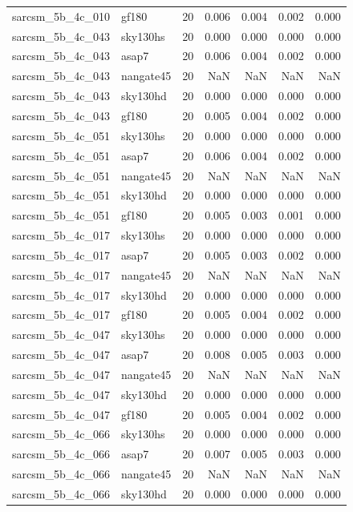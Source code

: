 \begin{tabular}{llrrrrr}
sarcsm\_5b\_4c\_010 & gf180 & 20 & 0.006 & 0.004 & 0.002 & 0.000 \\
sarcsm\_5b\_4c\_043 & sky130hs & 20 & 0.000 & 0.000 & 0.000 & 0.000 \\
sarcsm\_5b\_4c\_043 & asap7 & 20 & 0.006 & 0.004 & 0.002 & 0.000 \\
sarcsm\_5b\_4c\_043 & nangate45 & 20 & NaN & NaN & NaN & NaN \\
sarcsm\_5b\_4c\_043 & sky130hd & 20 & 0.000 & 0.000 & 0.000 & 0.000 \\
sarcsm\_5b\_4c\_043 & gf180 & 20 & 0.005 & 0.004 & 0.002 & 0.000 \\
sarcsm\_5b\_4c\_051 & sky130hs & 20 & 0.000 & 0.000 & 0.000 & 0.000 \\
sarcsm\_5b\_4c\_051 & asap7 & 20 & 0.006 & 0.004 & 0.002 & 0.000 \\
sarcsm\_5b\_4c\_051 & nangate45 & 20 & NaN & NaN & NaN & NaN \\
sarcsm\_5b\_4c\_051 & sky130hd & 20 & 0.000 & 0.000 & 0.000 & 0.000 \\
sarcsm\_5b\_4c\_051 & gf180 & 20 & 0.005 & 0.003 & 0.001 & 0.000 \\
sarcsm\_5b\_4c\_017 & sky130hs & 20 & 0.000 & 0.000 & 0.000 & 0.000 \\
sarcsm\_5b\_4c\_017 & asap7 & 20 & 0.005 & 0.003 & 0.002 & 0.000 \\
sarcsm\_5b\_4c\_017 & nangate45 & 20 & NaN & NaN & NaN & NaN \\
sarcsm\_5b\_4c\_017 & sky130hd & 20 & 0.000 & 0.000 & 0.000 & 0.000 \\
sarcsm\_5b\_4c\_017 & gf180 & 20 & 0.005 & 0.004 & 0.002 & 0.000 \\
sarcsm\_5b\_4c\_047 & sky130hs & 20 & 0.000 & 0.000 & 0.000 & 0.000 \\
sarcsm\_5b\_4c\_047 & asap7 & 20 & 0.008 & 0.005 & 0.003 & 0.000 \\
sarcsm\_5b\_4c\_047 & nangate45 & 20 & NaN & NaN & NaN & NaN \\
sarcsm\_5b\_4c\_047 & sky130hd & 20 & 0.000 & 0.000 & 0.000 & 0.000 \\
sarcsm\_5b\_4c\_047 & gf180 & 20 & 0.005 & 0.004 & 0.002 & 0.000 \\
sarcsm\_5b\_4c\_066 & sky130hs & 20 & 0.000 & 0.000 & 0.000 & 0.000 \\
sarcsm\_5b\_4c\_066 & asap7 & 20 & 0.007 & 0.005 & 0.003 & 0.000 \\
sarcsm\_5b\_4c\_066 & nangate45 & 20 & NaN & NaN & NaN & NaN \\
sarcsm\_5b\_4c\_066 & sky130hd & 20 & 0.000 & 0.000 & 0.000 & 0.000 \\

\end{tabular}
